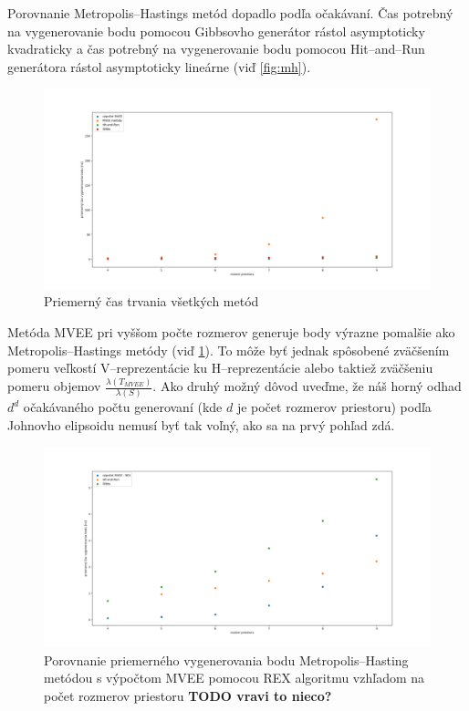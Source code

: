 Porovnanie Metropolis--Hastings metód dopadlo podľa očakávaní. Čas potrebný na vygenerovanie bodu pomocou Gibbsovho generátor rástol asymptoticky kvadraticky a čas potrebný na vygenerovanie bodu pomocou Hit--and--Run generátora rástol asymptoticky lineárne (viď \ref{fig:mh}).

\begin{figure} [H]
  \includegraphics[width=\linewidth]{images/vsetky.png}
  \caption{Priemerný čas trvania všetkých metód}
  \label{fig:vsetky}
\end{figure}

Metóda MVEE pri vyššom počte rozmerov generuje body výrazne pomalšie ako Metropolis--Hastings metódy (viď \ref{fig:vsetky}). To môže byť jednak spôsobené zväčšením pomeru veľkostí V--reprezentácie ku H--reprezentácie alebo taktiež zväčšeniu pomeru objemov $\frac{\lambda(T_{MVEE})}{\lambda(S)}$. 
Ako druhý možný dôvod uveďme, že náš horný odhad $d^d$ očakávaného počtu generovaní (kde $d$ je počet rozmerov priestoru) podľa Johnovho elipsoidu nemusí byť tak voľný, ako sa na prvý pohľad zdá.\\

\begin{figure} [H]
	\includegraphics[width=\linewidth]{images/mh_rex.png}
	\caption{Porovnanie priemerného vygenerovania bodu Metropolis--Hasting metódou s výpočtom MVEE pomocou REX algoritmu vzhľadom na počet rozmerov priestoru \textbf{TODO vravi to nieco?}}
	\label{fig:mh_rex}
\end{figure}

